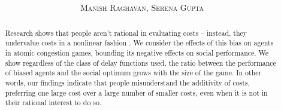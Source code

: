 \documentclass[twoside]{article}
\title{\vspace{-15mm}\fontsize{24pt}{10pt}\selectfont\textbf{\titlee}} %
\author{
\large
\textsc{Manish Raghavan, Serena Gupta}
\vspace{-5mm}
}
\begin{document}
\maketitle %

\thispagestyle{fancy} %

\begin{abstract}
Research shows that people aren't rational in evaluating costs -- instead, they undervalue costs in a nonlinear fashion \cite{Kahneman1979}. We consider the effects of this bias on agents in atomic congestion games, bounding its negative effects on social performance. We show regardless
  of the class of delay functions used, the ratio between the performance of
  biased agents and the social optimum grows with the size of the game. In other words, our findings indicate that people misunderstand the additivity of
  costs, preferring one large cost over a large number of smaller costs, even
  when it is not in their rational interest to do so.

\end{abstract}
\end{document}
